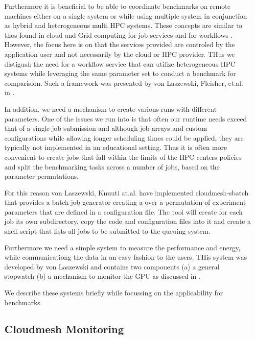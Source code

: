 \documentclass[utf8]{FrontiersinVancouver} %
\begin{document}
Furthermore it is beneficial to be able to coordinate benchmarks on
remote machines either on a single system or while using multiple
system in conjunction as hybrid and heterogeneous multi HPC
systems. These concepts are similar to thos found in cloud and Grid
computing for job services \citep{las-infogram} and for workflows
\citep{las-workflow,las07-workflow}. However, the focus here is on
that the services provided are controled by the application user and
not necessarily by the cloud or HPC provider. THus we distigush the
need for a workflow service that can utilize heterogeneous HPC systems
while leveraging the same parameter set to conduct a benchmark for
comparision. Such a framework was presented by von Laszewski,
Fleisher, et.al. in \citep{las-22-arxiv-workflow-cc}.

In addition, we need a mechanism to create various runs with different
parameters. One of the issues we run into is that often our runtime
needs exceed that of a single job submission and although job arrays
and custom configurations while allowing longer scheduling times could
be applied, they are typically not implemented in an educational
setting. Thus it is often more convenient to create jobs that fall
within the limits of the HPC centers policies and split the
benchmarking tasks across a number of jobs, based on the parameter
permutations.

For this reason von Laszewski, Knuuti at.al. have implemented
cloudmesh-sbatch that provides a batch job generator creating a over a
permutation of experiment parameters that are defined in a
configuration file. The tool will create for each job its own
subdirectory, copy the code and configuration files into it and create
a shell script that lists all jobs to be submitted to the queuing
system.

Furthermore we need a simple system to measure the performance and
energy, while communicationg the data in an easy fashion to the
users. THis system was developed by von Laszewski and contains two
components (a) a general stopwatch (b) a mechanism to monitor the GPU
as discussed in \label{sec:monitoring}.

We describe these systems briefly while focussing on the applicability
for benchmarks.

\subsection{Cloudmesh Monitoring}
\label{sec:monitoring}
\end{document}
